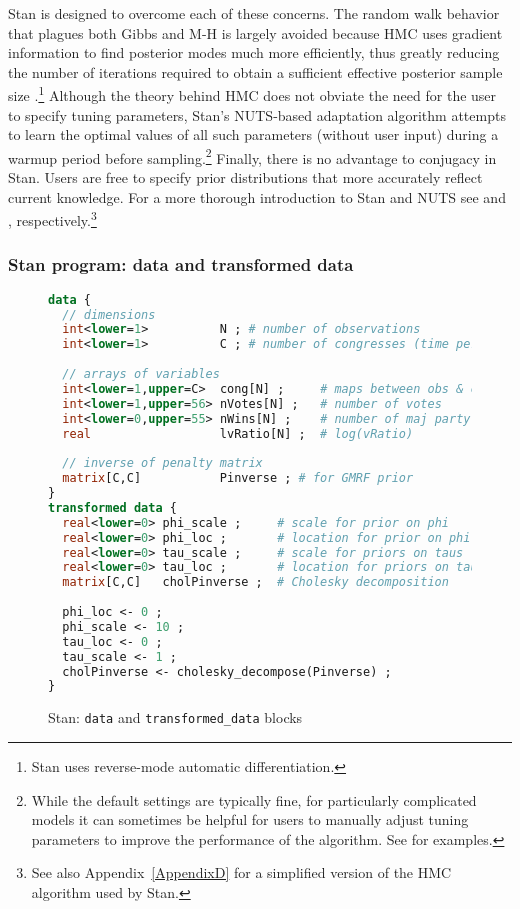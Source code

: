 Stan is designed to overcome each of these concerns. The random walk behavior that plagues both 
Gibbs and M-H is largely avoided because HMC uses gradient information to find posterior modes 
much more efficiently, thus greatly reducing the number of iterations required to obtain a sufficient 
effective posterior sample size .\footnote{Stan uses reverse-mode automatic
differentiation.}  Although the theory behind HMC does not obviate the need for the user to specify 
tuning parameters, Stan's NUTS-based adaptation algorithm attempts to learn the optimal values 
of all such parameters (without user input) during a warmup period before sampling.\footnote{While 
the default settings are typically fine, for particularly complicated models it can sometimes be helpful 
for users to manually adjust tuning parameters to improve the performance of the algorithm. See 
 for examples.} Finally, there is no advantage to conjugacy 
in Stan. Users are free to specify prior distributions that more accurately reflect current knowledge. 
For a more thorough introduction to Stan and NUTS see  
and , respectively.\footnote{See also Appendix~\ref{AppendixD} for a simplified 
version of the HMC algorithm used by Stan.}

\subsubsection{Stan program: data and transformed data}

\begin{figure}[t]
\begin{lstlisting}[language=Stan, frame=trBL]
data {
  // dimensions 
  int<lower=1>          N ; # number of observations 
  int<lower=1>          C ; # number of congresses (time periods)
  
  // arrays of variables 
  int<lower=1,upper=C>  cong[N] ;     # maps between obs & congress
  int<lower=1,upper=56> nVotes[N] ;   # number of votes
  int<lower=0,upper=55> nWins[N] ;    # number of maj party victories
  real                  lvRatio[N] ;  # log(vRatio)
  
  // inverse of penalty matrix 
  matrix[C,C]           Pinverse ; # for GMRF prior
}
transformed data {
  real<lower=0> phi_scale ;     # scale for prior on phi
  real<lower=0> phi_loc ;       # location for prior on phi
  real<lower=0> tau_scale ;     # scale for priors on taus
  real<lower=0> tau_loc ;       # location for priors on taus
  matrix[C,C]   cholPinverse ;  # Cholesky decomposition 
  
  phi_loc <- 0 ;
  phi_scale <- 10 ;
  tau_loc <- 0 ;
  tau_scale <- 1 ;
  cholPinverse <- cholesky_decompose(Pinverse) ;
}
\end{lstlisting}
\caption{Stan: {\tt data} and {\tt transformed\_data} blocks}
\label{stan_data}
\end{figure}

